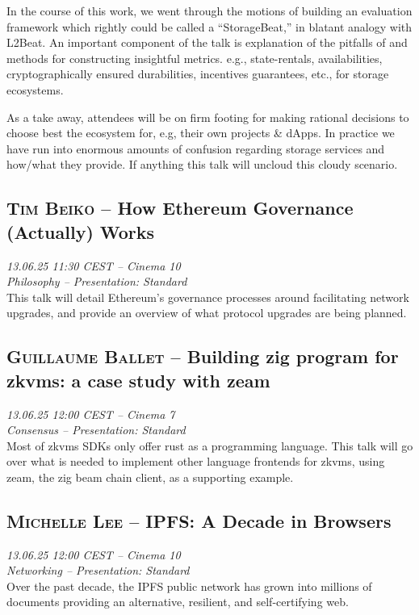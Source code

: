 In the course of this work, we went through the motions of building an evaluation framework which rightly could be called a ``StorageBeat,'' in blatant analogy with L2Beat. An important component of the talk is explanation of the pitfalls of and methods for constructing insightful metrics. e.g., state-rentals, availabilities, cryptographically ensured durabilities, incentives guarantees, etc., for storage ecosystems.

As a take away, attendees will be on firm footing for making rational decisions to choose best the ecosystem for, e.g, their own projects \& dApps. In practice we have run into enormous amounts of confusion regarding storage services and how/what they provide. If anything this talk will uncloud this cloudy scenario.

\clearpage
\subsection {\textsc{Tim Beiko}  -- How Ethereum Governance (Actually) Works} \noindent \textit {13.06.25 11:30 CEST -- Cinema 10\\ Philosophy -- Presentation: Standard}\\[1em] This talk will detail Ethereum's governance processes around facilitating network upgrades, and provide an overview of what protocol upgrades are being planned.

\clearpage
\subsection {\textsc{Guillaume Ballet}  -- Building zig program for zkvms: a case study with zeam} \noindent \textit {13.06.25 12:00 CEST -- Cinema 7\\ Consensus -- Presentation: Standard}\\[1em] Most of zkvms SDKs only offer rust as a programming language. This talk will go over what is needed to implement other language frontends for zkvms, using zeam, the zig beam chain client, as a supporting example.

\clearpage
\subsection {\textsc{Michelle Lee}  -- IPFS: A Decade in Browsers} \noindent \textit {13.06.25 12:00 CEST -- Cinema 10\\ Networking -- Presentation: Standard}\\[1em] Over the past decade, the IPFS public network has grown into millions of documents providing an alternative, resilient, and self-certifying web.

